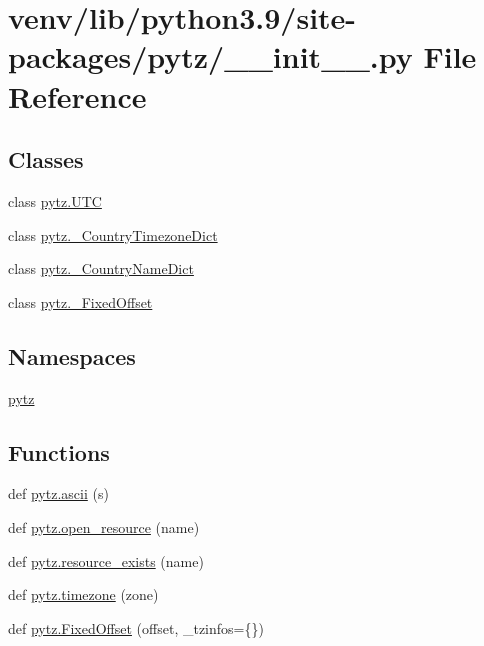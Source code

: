 \hypertarget{venv_2lib_2python3_89_2site-packages_2pytz_2____init_____8py}{}\section{venv/lib/python3.9/site-\/packages/pytz/\+\_\+\+\_\+init\+\_\+\+\_\+.py File Reference}
\label{venv_2lib_2python3_89_2site-packages_2pytz_2____init_____8py}
\subsection*{Classes}
\begin{DoxyCompactItemize}
\item 
class \hyperlink{classpytz_1_1UTC}{pytz.\+U\+TC}
\item 
class \hyperlink{classpytz_1_1__CountryTimezoneDict}{pytz.\+\_\+\+Country\+Timezone\+Dict}
\item 
class \hyperlink{classpytz_1_1__CountryNameDict}{pytz.\+\_\+\+Country\+Name\+Dict}
\item 
class \hyperlink{classpytz_1_1__FixedOffset}{pytz.\+\_\+\+Fixed\+Offset}
\end{DoxyCompactItemize}
\subsection*{Namespaces}
\begin{DoxyCompactItemize}
\item 
 \hyperlink{namespacepytz}{pytz}
\end{DoxyCompactItemize}
\subsection*{Functions}
\begin{DoxyCompactItemize}
\item 
def \hyperlink{namespacepytz_a3b47f581b0f7a2e44fc39a9e56941618}{pytz.\+ascii} (s)
\item 
def \hyperlink{namespacepytz_a902975213c079691292a54e1a341891c}{pytz.\+open\+\_\+resource} (name)
\item 
def \hyperlink{namespacepytz_a438c8878c1f251185ee9f2233acf6f89}{pytz.\+resource\+\_\+exists} (name)
\item 
def \hyperlink{namespacepytz_a864aeabe33e444f56b55e925803db0be}{pytz.\+timezone} (zone)
\item 
def \hyperlink{namespacepytz_af79016a547a0b7bae15ac4218644a224}{pytz.\+Fixed\+Offset} (offset, \+\_\+tzinfos=\{\})
\end{DoxyCompactItemize}
